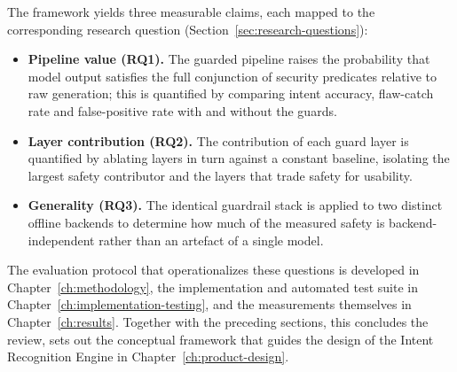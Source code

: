 The framework yields three measurable claims, each mapped to the corresponding
research question (Section~\ref{sec:research-questions}):
\begin{itemize}
\item \textbf{Pipeline value (RQ1).} The guarded pipeline raises the
probability that model output satisfies the full conjunction of security
predicates relative to raw generation; this is quantified by comparing intent
accuracy, flaw-catch rate and false-positive rate with and without the guards.
\item \textbf{Layer contribution (RQ2).} The contribution of each guard layer is
quantified by ablating layers in turn against a constant baseline, isolating the
largest safety contributor and the layers that trade safety for usability.
\item \textbf{Generality (RQ3).} The identical guardrail stack is applied to two
distinct offline backends to determine how much of the measured safety is
backend-independent rather than an artefact of a single model.
\end{itemize}
The evaluation protocol that operationalizes these questions is developed in
Chapter~\ref{ch:methodology}, the implementation and automated test suite in
Chapter~\ref{ch:implementation-testing}, and the measurements themselves in
Chapter~\ref{ch:results}. Together with the preceding sections, this concludes
the review, sets out the conceptual framework that guides the design of the
Intent Recognition Engine in Chapter~\ref{ch:product-design}.

